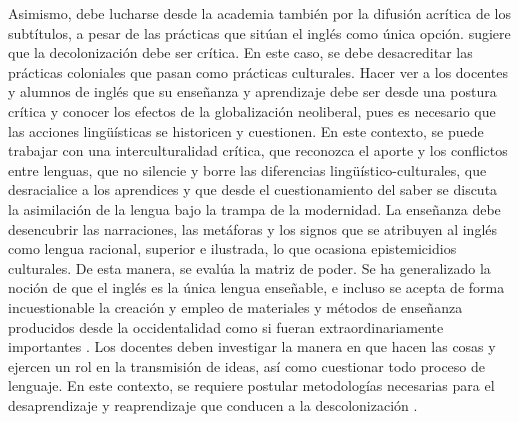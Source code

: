 \documentclass[spanish]{textolivre}
\begin{document}
Asimismo, debe lucharse desde la academia también por la difusión acrítica de los subtítulos, a pesar de las prácticas que sitúan el inglés como única opción. \textcite{baum2019decir} sugiere que la decolonización debe ser crítica. En este caso, se debe desacreditar las prácticas coloniales que pasan como prácticas culturales. Hacer ver a los docentes y alumnos de inglés que su enseñanza y aprendizaje debe ser desde una postura crítica y conocer los efectos de la globalización neoliberal, pues es necesario que las acciones lingüísticas se historicen y cuestionen. En este contexto, se puede trabajar con una interculturalidad crítica, que reconozca el aporte y los conflictos entre lenguas, que no silencie y borre las diferencias lingüístico-culturales, que desracialice a los aprendices y que desde el cuestionamiento del saber se discuta la asimilación de la lengua bajo la trampa de la modernidad. La enseñanza debe desencubrir las narraciones, las metáforas y los signos que se atribuyen al inglés como lengua racional, superior e ilustrada, lo que ocasiona epistemicidios culturales. De esta manera, se evalúa la matriz de poder. Se ha generalizado la noción de que el inglés es la única lengua enseñable, e incluso se acepta de forma incuestionable la creación y empleo de materiales y métodos de enseñanza producidos desde la occidentalidad como si fueran extraordinariamente importantes \cite{fandino-parra_decolonizing_2021}. Los docentes deben investigar la manera en que hacen las cosas y ejercen un rol en la transmisión de ideas, así como cuestionar todo proceso de lenguaje. En este contexto, se requiere postular metodologías necesarias para el desaprendizaje y reaprendizaje que conducen a la descolonización \cite{lara2015pensamiento}. 
\end{document}
